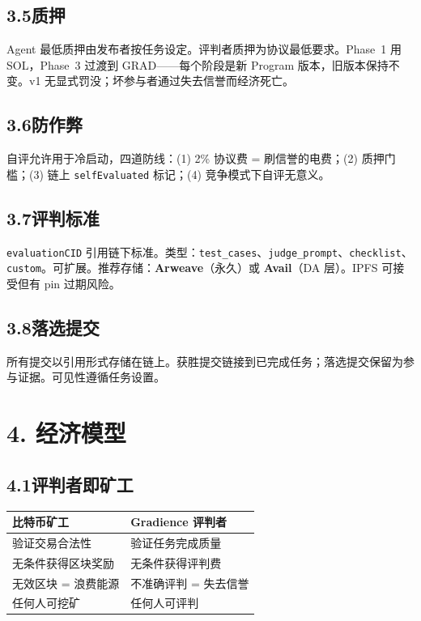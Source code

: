 \documentclass[11pt,a4paper]{article}
\begin{document}
\subsection{3.5\quad 质押}
Agent 最低质押由发布者按任务设定。评判者质押为协议最低要求。Phase~1 用 SOL，Phase~3 过渡到 GRAD——每个阶段是新 Program 版本，旧版本保持不变。v1 无显式罚没；坏参与者通过失去信誉而经济死亡。

\subsection{3.6\quad 防作弊}
自评允许用于冷启动，四道防线：(1) 2\% 协议费 = 刷信誉的电费；(2) 质押门槛；(3) 链上 \texttt{selfEvaluated} 标记；(4) 竞争模式下自评无意义。

\subsection{3.7\quad 评判标准}
\texttt{evaluationCID} 引用链下标准。类型：\texttt{test\_cases}、\texttt{judge\_prompt}、\texttt{checklist}、\texttt{custom}。可扩展。推荐存储：\textbf{Arweave}（永久）或 \textbf{Avail}（DA 层）。IPFS 可接受但有 pin 过期风险。

\subsection{3.8\quad 落选提交}
所有提交以引用形式存储在链上。获胜提交链接到已完成任务；落选提交保留为参与证据。可见性遵循任务设置。

\section{4. 经济模型}

\subsection{4.1\quad 评判者即矿工}

\begin{table}[H]\centering
\begin{tabular}{@{}ll@{}}
\toprule
\textbf{比特币矿工} & \textbf{Gradience 评判者} \\
\midrule
验证交易合法性 & 验证任务完成质量 \\
无条件获得区块奖励 & 无条件获得评判费 \\
无效区块 = 浪费能源 & 不准确评判 = 失去信誉 \\
任何人可挖矿 & 任何人可评判 \\
\bottomrule
\end{tabular}
\end{table}
\end{document}
